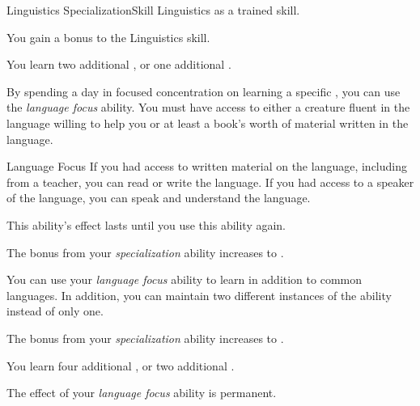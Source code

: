     \begin{feat}{Linguistics Specialization}{Skill}
        \featpre Linguistics as a trained skill.

         You gain a  bonus to the Linguistics skill.

         You learn two additional , or one additional .

         By spending a day in focused concentration on learning a specific , you can use the \textit{language focus} ability.
        You must have access to either a creature fluent in the language willing to help you or at least a book's worth of material written in the language.
        \begin{freeability}{Language Focus}
            If you had access to written material on the language, including from a teacher, you can read or write the language.
            If you had access to a speaker of the language, you can speak and understand the language.

            This ability's effect lasts until you use this ability again.
        \end{freeability}

         The bonus from your \textit{specialization} ability increases to .

         You can use your \textit{language focus} ability to learn  in addition to common languages.
        In addition, you can maintain two different instances of the ability instead of only one.

         The bonus from your \textit{specialization} ability increases to .

         You learn four additional , or two additional .

         The effect of your \textit{language focus} ability is permanent.
    \end{feat}

